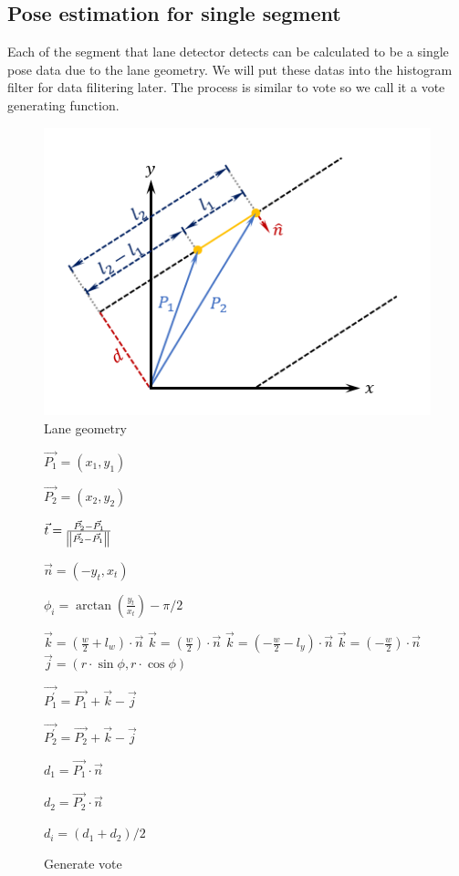 \documentclass{article}
\begin{document}
\subsection{Pose estimation for single segment}

Each of the segment that lane detector detects can be calculated to be a single pose data due to the lane geometry. We will put these datas into the histogram filter for data filitering later. The process is similar to vote so we call it a vote generating function.

\begin{figure}[ht]
  \label{fig:lane_geometry}
  \centering
  \includegraphics[scale=1]{graphs/lane_geometry.PNG}
  \caption{Lane geometry}
\end{figure}
\FloatBarrier

\begin{figure} [ht]
\begin{algorithm}[H]
	$\vec{P_1} = (x_1, y_1)$

	$\vec{P_2} = (x_2, y_2)$

	$\vec{t} = \frac{\vec{P_2} - \vec{P_1}}
					{\norm{\vec{P_2} - \vec{P_1}}}$

	$\vec{n} = (-y_t, x_t)$

	$\phi_{i} = \arctan(\frac{y_t}{x_t}) - \pi / 2$

		{
			{
				$\vec{k} = (\frac{w}{2} + l_w) \cdot \vec{n}$
			}
			{
				$\vec{k} = (\frac{w}{2}) \cdot \vec{n}$
			}
		}
		{
			{
				$\vec{k} = (-\frac{w}{2} - l_y) \cdot \vec{n}$
			}
			{
				$\vec{k} = (-\frac{w}{2}) \cdot \vec{n}$
			}
		}
	$\vec{j} = (r \cdot \sin\phi, r \cdot \cos\phi)$

	$\vec{P_1^\prime} = \vec{P_1} + \vec{k} - \vec{j}$

	$\vec{P_2^\prime} = \vec{P_2} + \vec{k} - \vec{j}$

	$d_1 = \vec{P_1} \cdot \vec{n}$

	$d_2 = \vec{P_2} \cdot \vec{n}$

	$d_{i} = (d_1 + d_2) / 2$
	\caption{Generate vote}
\end{algorithm}
\end{figure}
\FloatBarrier
\end{document}
